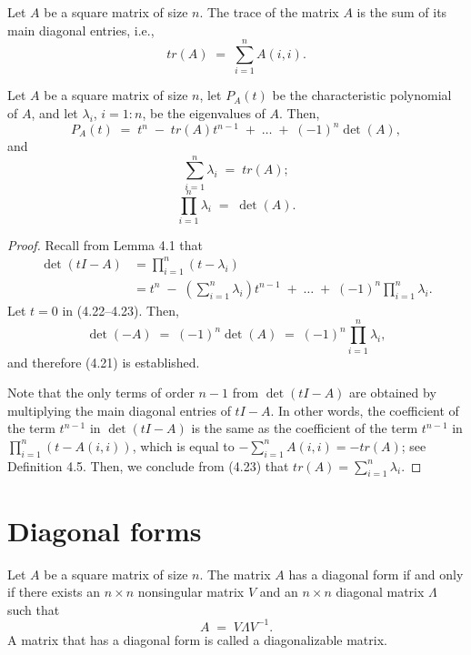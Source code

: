 \begin{definition}
Let $A$ be a square matrix of size $n$. The trace of the matrix $A$ is the sum of its
main diagonal entries, i.e.,
\begin{equation}
tr(A) \;=\; \sum_{i=1}^n A(i,i).
\end{equation}
\end{definition}

\begin{lemma}
Let $A$ be a square matrix of size $n$, let $P_A(t)$ be the characteristic polynomial
of $A$, and let $\lambda_i$, $i = 1:n$, be the eigenvalues of $A$. Then,
\begin{equation}
P_A(t) \;=\; t^n \;-\; tr(A)t^{n-1} \;+\; \dots \;+\; (-1)^n \det(A),
\end{equation}
and
\begin{equation}
\sum_{i=1}^n \lambda_i \;=\; tr(A);
\end{equation}
\begin{equation}
\prod_{i=1}^n \lambda_i \;=\; \det(A).
\end{equation}
\end{lemma}

\begin{proof}
Recall from Lemma 4.1 that
\begin{align}
\det(tI-A) &= \prod_{i=1}^n (t-\lambda_i)\\
&= t^n \;-\; \left( \sum_{i=1}^n \lambda_i \right) t^{n-1} \;+\; \dots \;+\;
(-1)^n \prod_{i=1}^n \lambda_i.
\end{align}
Let $t=0$ in (4.22--4.23). Then,
\[
\det(-A) \;=\; (-1)^n \det(A) \;=\; (-1)^n \prod_{i=1}^n \lambda_i,
\]
and therefore (4.21) is established.

Note that the only terms of order $n-1$ from $\det(tI-A)$ are obtained by multiplying
the main diagonal entries of $tI-A$. In other words, the coefficient of the term
$t^{n-1}$ in $\det(tI-A)$ is the same as the coefficient of the term $t^{n-1}$ in
$\prod_{i=1}^n (t-A(i,i))$, which is equal to $-\sum_{i=1}^n A(i,i) = -tr(A)$; see
Definition 4.5. Then, we conclude from (4.23) that $tr(A) = \sum_{i=1}^n \lambda_i$.
\end{proof}

\section{Diagonal forms}

\begin{definition}
Let $A$ be a square matrix of size $n$. The matrix $A$ has a diagonal form if and only
if there exists an $n \times n$ nonsingular matrix $V$ and an $n \times n$ diagonal
matrix $\Lambda$ such that
\begin{equation}
A \;=\; V\Lambda V^{-1}.
\end{equation}
A matrix that has a diagonal form is called a diagonalizable matrix.
\end{definition}

